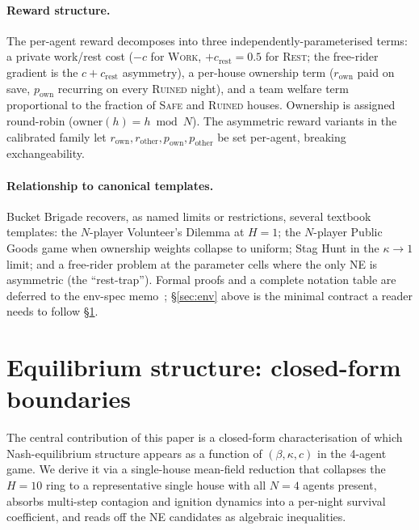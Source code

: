 \documentclass{anvil-paper}
\begin{document}
\paragraph{Reward structure.}
The per-agent reward decomposes into three independently-parameterised terms:
a private work/rest cost ($-c$ for \textsc{Work}, $+c_{\text{rest}}{=}0.5$
for \textsc{Rest}; the free-rider gradient is the $c{+}c_{\text{rest}}$
asymmetry), a per-house ownership term ($r_{\text{own}}$ paid on save,
$p_{\text{own}}$ recurring on every \textsc{Ruined} night), and a team
welfare term proportional to the fraction of \textsc{Safe} and
\textsc{Ruined} houses. Ownership is assigned round-robin
($\text{owner}(h){=}h\bmod N$). The asymmetric reward variants in the
calibrated family let $r_{\text{own}},r_{\text{other}},p_{\text{own}},
p_{\text{other}}$ be set per-agent, breaking exchangeability.

\paragraph{Relationship to canonical templates.}
Bucket Brigade recovers, as named limits or restrictions, several textbook
templates: the $N$-player Volunteer's Dilemma at $H{=}1$; the $N$-player
Public Goods game when ownership weights collapse to uniform; Stag Hunt in
the $\kappa{\to}1$ limit; and a free-rider problem at the parameter cells
where the only NE is asymmetric (the ``rest-trap''). Formal proofs and a
complete notation table are deferred to the env-spec memo~\citep{bbenvspec};
\S\ref{sec:env} above is the minimal contract a reader needs to follow
\S\ref{sec:ne}.

\section{Equilibrium structure: closed-form boundaries}
\label{sec:ne}

The central contribution of this paper is a closed-form characterisation of
which Nash-equilibrium structure appears as a function of $(\beta,\kappa,c)$
in the 4-agent game. We derive it via a single-house mean-field reduction
that collapses the $H{=}10$ ring to a representative single house with all
$N{=}4$ agents present, absorbs multi-step contagion and ignition dynamics
into a per-night survival coefficient, and reads off the NE candidates as
algebraic inequalities.
\end{document}
